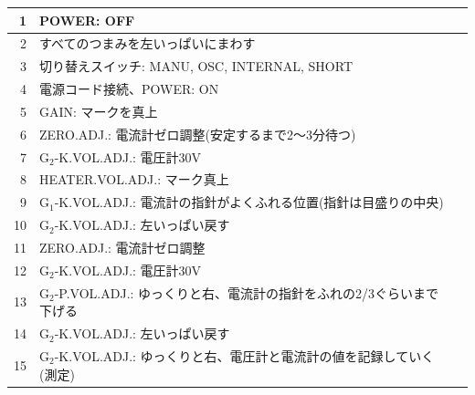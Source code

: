 \begin{tabular}{|r|p{14cm}|p{0.7cm}|}
\hline
1 & POWER: OFF & \\
\hline
2 & すべてのつまみを左いっぱいにまわす & \\
\hline
3 & 切り替えスイッチ: MANU, OSC, INTERNAL, SHORT & \\
\hline
4 & 電源コード接続、POWER: ON & \\
\hline
5 & GAIN: マークを真上 & \\
\hline
6 & ZERO.ADJ.: 電流計ゼロ調整(安定するまで2〜3分待つ) & \\
\hline
7 & G${}_2$-K.VOL.ADJ.: 電圧計30V &\\
\hline
8 & HEATER.VOL.ADJ.: マーク真上 & \\
\hline
9 & G${}_1$-K.VOL.ADJ.: 電流計の指針がよくふれる位置(指針は目盛りの中央) & \\
\hline
10 & G${}_2$-K.VOL.ADJ.: 左いっぱい戻す & \\ 
\hline
11 & ZERO.ADJ.: 電流計ゼロ調整 & \\
\hline
12 & G${}_2$-K.VOL.ADJ.: 電圧計30V &\\
\hline
13 &  G${}_2$-P.VOL.ADJ.: ゆっくりと右、電流計の指針をふれの2/3ぐらいまで下げる &\\
\hline
14 & G${}_2$-K.VOL.ADJ.: 左いっぱい戻す & \\ 
\hline
15 &  G${}_2$-K.VOL.ADJ.: ゆっくりと右、電圧計と電流計の値を記録していく(測定)  & \\
\hline
\end{tabular}

